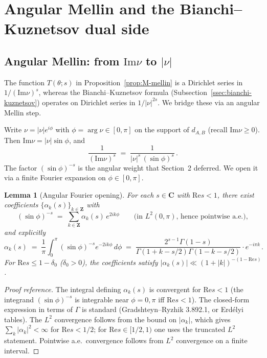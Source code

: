 \documentclass[11pt]{article}
\newtheorem{lemma}[theorem]{Lemma}
\theoremstyle{definition}
\newcommand{\Z}{\mathbf{Z}}
\newcommand{\C}{\mathbf{C}}
\renewcommand{\Re}{\mathrm{Re}}
\renewcommand{\Im}{\mathrm{Im}}
\begin{document}

\section{Angular Mellin and the Bianchi--Kuznetsov dual side}\label{sec:kuznetsov}

\subsection{Angular Mellin: from $\Im\nu$ to $|\nu|$}\label{ssec:angular-mellin}

The function $T(\theta;s)$ in Proposition~\ref{prop:M-mellin} is a Dirichlet series in $1/(\Im\nu)^s$, whereas the Bianchi--Kuznetsov formula (Subsection~\ref{ssec:bianchi-kuznetsov}) operates on Dirichlet series in $1/|\nu|^{2s}$. We bridge these via an angular Mellin step.

Write $\nu=|\nu|e^{i\phi}$ with $\phi=\arg\nu\in[0,\pi]$ on the support of $d_{A,B}$ (recall $\Im\nu\ge 0$). Then $\Im\nu=|\nu|\sin\phi$, and
\begin{equation}\label{eq:angular-decomp}
   \frac{1}{(\Im\nu)^s}\;=\;\frac{1}{|\nu|^s\,(\sin\phi)^s}\,.
\end{equation}
The factor $(\sin\phi)^{-s}$ is the angular weight that Section~2 deferred. We open it via a finite Fourier expansion on $\phi\in[0,\pi]$.

\begin{lemma}[Angular Fourier opening]\label{lem:angular-fourier}
For each $s\in\C$ with $\Re s<1$, there exist coefficients $\{\alpha_k(s)\}_{k\in\Z}$ with
\[
   (\sin\phi)^{-s}\;=\;\sum_{k\in\Z}\alpha_k(s)\,e^{2ik\phi}\qquad\text{(in $L^2(0,\pi)$, hence pointwise a.e.)},
\]
and explicitly
\[
   \alpha_k(s)\;=\;\frac{1}{\pi}\int_0^\pi(\sin\phi)^{-s}e^{-2ik\phi}\,d\phi\;=\;\frac{2^{s-1}\Gamma(1-s)}{\Gamma(1+k-s/2)\Gamma(1-k-s/2)}\cdot e^{-i\pi k}\,.
\]
For $\Re s\le 1-\delta_0$ ($\delta_0>0$), the coefficients satisfy $|\alpha_k(s)|\ll(1+|k|)^{-(1-\Re s)}$.
\end{lemma}

\begin{proof}[Proof reference]
The integral defining $\alpha_k(s)$ is convergent for $\Re s<1$ (the integrand $(\sin\phi)^{-s}$ is integrable near $\phi=0,\pi$ iff $\Re s<1$). The closed-form expression in terms of $\Gamma$ is standard (Gradshteyn--Ryzhik 3.892.1, or Erdélyi tables). The $L^2$ convergence follows from the bound on $|\alpha_k|$, which gives $\sum_k|\alpha_k|^2<\infty$ for $\Re s<1/2$; for $\Re s\in[1/2,1)$ one uses the truncated $L^2$ statement. Pointwise a.e.\ convergence follows from $L^2$ convergence on a finite interval.
\end{proof}
\end{document}
